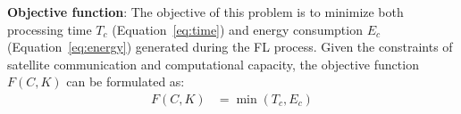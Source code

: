 \textbf{Objective function}: The objective of this problem is to minimize both processing time $T_c$ (Equation~\ref{eq:time}) and energy consumption  $E_c$ (Equation~\ref{eq:energy}) generated during the FL process. Given the constraints of satellite communication and computational capacity, the objective function $F(C,K)$ can be formulated as:
\begin{align}
F(C,K) &= \min  (T_c , E_c)
\end{align}






\iffalse
s.t.
\begin{subequations}
\begin{equation}
x_a \in \{0, 1\}, \ \forall a \in A,\label{eq:x_a}
\end{equation}
\begin{equation}
y_v \in \{0, 1\}, \ \forall v \in V,\label{eq:y_v}
\end{equation}
\begin{equation}
\Psi \in \{0, 1\}
\end{equation}
\begin{equation}
     0 \leq t_{i} \leq t_{\text{max}},\label{eq:t}
\end{equation}


\
\end{subequations}
where constraints~\ref{eq:x_a} and \ref{eq:y_v} confirm that $x_a$ and $y_v$ are binary decision variables, while $\Psi$ is a weight parameter. Constraint~\ref{eq:t} denotes that the transmission delay should not exceed the maximum allowable delay.

\fi
